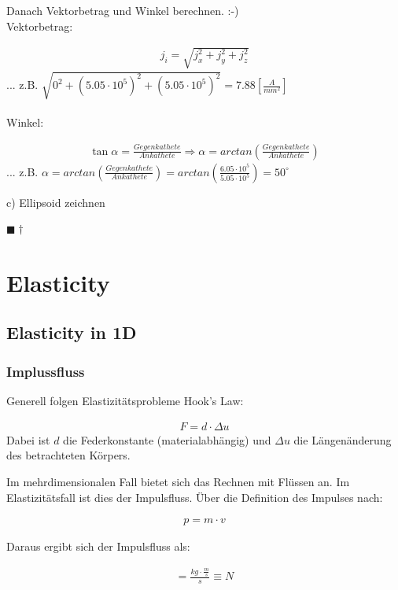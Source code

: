 \documentclass[a4paper]{scrartcl}
\newcommand{\qed}{\begin{flushright}
$\blacksquare \dagger$ \end{flushright}}
\begin{document}
Danach Vektorbetrag und Winkel berechnen. :-)\\
 
Vektorbetrag: 

\begin{align}
j_i=\sqrt{j_x^2+j_y^2+j_z^2}
\end{align}
... z.B. $\sqrt{ 0^2+(5.05 \cdot 10^5)^2+(5.05 \cdot 10^5)^2 } = 7.88 [\frac{A}{mm^2}]$ 
\\
\\
Winkel:

\begin{align}
\tan{\alpha}=\frac{Gegenkathete}{Ankathete} \Rightarrow \alpha=arctan(\frac{Gegenkathete}{Ankathete})
\end{align}
... z.B. $ \alpha=arctan(\frac{Gegenkathete}{Ankathete}) = arctan(\frac{6.05 \cdot 10^5}{5.05 \cdot 10^5}) = 50^\circ $


c) Ellipsoid zeichnen



\qed

\section{Elasticity}
\subsection{Elasticity in 1D}
\subsubsection{Implussfluss}
Generell folgen Elastizitätsprobleme Hook's Law:

\begin{align}
F=d \cdot \Delta u
\end{align}
Dabei ist $d$ die Federkonstante (materialabhängig) und $\Delta u$ die
Längenänderung des betrachteten Körpers.

Im mehrdimensionalen Fall bietet sich das Rechnen mit Flüssen an. Im
Elastizitätsfall ist dies der Impulsfluss. Über die Definition des Impulses
nach:

\begin{align}
p = m \cdot v
\end{align}

Daraus ergibt sich der Impulsfluss als:

\begin{align}
[J_p]=\frac{kg \cdot \frac{m}{s}}{s} \equiv N
\end{align}
\end{document}
